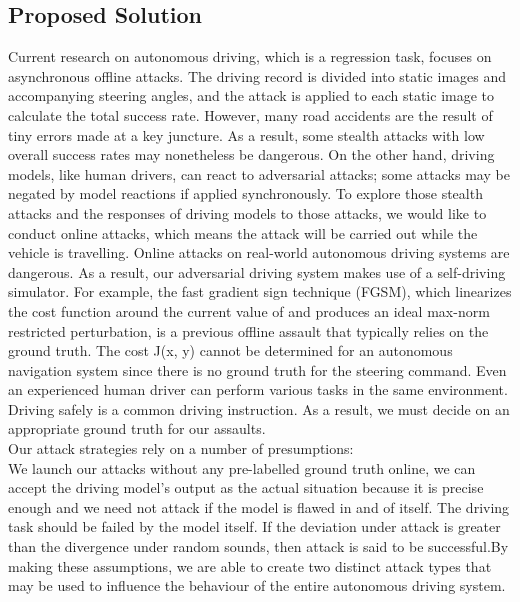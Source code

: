 \documentclass[ 12pt,a4paper,twocolumn,fleqn]{article}
\begin{document}
\subsection{Proposed Solution}
Current research on autonomous driving, which is a regression task, focuses on asynchronous offline attacks. The driving record is divided into static images and accompanying steering angles, and the attack is applied to each static image to calculate the total success rate. However, many road accidents are the result of tiny errors made at a key juncture. As a result, some stealth attacks with low overall success rates may nonetheless be dangerous. On the other hand, driving models, like human drivers, can react to adversarial attacks; some attacks may be negated by model reactions if applied synchronously. To explore those stealth attacks and the responses of driving models to those attacks, we would like to conduct online attacks, which means the attack will be carried out while the vehicle is travelling. Online attacks on real-world autonomous driving systems are dangerous. As a result, our adversarial driving system makes use of a self-driving simulator. For example, the fast gradient sign technique (FGSM), which linearizes the cost function around the current value of and produces an ideal max-norm restricted perturbation, is a previous offline assault that typically relies on the ground truth. The cost J(x, y) cannot be determined for an autonomous navigation system since there is no ground truth for the steering command. Even an experienced human driver can perform various tasks in the same environment. Driving safely is a common driving instruction. As a result, we must decide on an appropriate ground truth for our assaults. \\
%
Our attack strategies rely on a number of presumptions:\\
%
We launch our attacks without any pre-labelled ground truth online, we can accept the driving model's output as the actual situation because it is precise enough and we need not attack if the model is flawed in and of itself. The driving task should be failed by the model itself. If the deviation under attack is greater than the divergence under random sounds, then attack is said to be successful.By making these assumptions, we are able to create two distinct attack types that may be used to influence the behaviour of the entire autonomous driving system.\\
%
\end{document}
